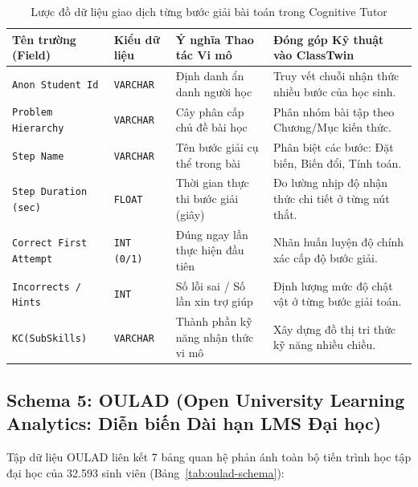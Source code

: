 \begin{table}[htbp]
  \centering\small
  \caption{Lược đồ dữ liệu giao dịch từng bước giải bài toán trong Cognitive Tutor}\label{tab:cognitive-tutor-schema}
  \begin{tabularx}{\textwidth}{p{3.8cm} p{2.2cm} p{4.0cm} X}
    \toprule
    \textbf{Tên trường (Field)} & \textbf{Kiểu dữ liệu} & \textbf{Ý nghĩa Thao tác Vi mô} & \textbf{Đóng góp Kỹ thuật vào ClassTwin} \\
    \midrule
    \texttt{Anon Student Id} & \texttt{VARCHAR} & Định danh ẩn danh người học & Truy vết chuỗi nhận thức nhiều bước của học sinh. \\
    \addlinespace
    \texttt{Problem Hierarchy} & \texttt{VARCHAR} & Cây phân cấp chủ đề bài học & Phân nhóm bài tập theo Chương/Mục kiến thức. \\
    \addlinespace
    \texttt{Step Name} & \texttt{VARCHAR} & Tên bước giải cụ thể trong bài & Phân biệt các bước: Đặt biến, Biến đổi, Tính toán. \\
    \addlinespace
    \texttt{Step Duration (sec)} & \texttt{FLOAT} & Thời gian thực thi bước giải (giây) & Đo lường nhịp độ nhận thức chi tiết ở từng nút thắt. \\
    \addlinespace
    \texttt{Correct First Attempt} & \texttt{INT (0/1)} & Đúng ngay lần thực hiện đầu tiên & Nhãn huấn luyện độ chính xác cấp độ bước giải. \\
    \addlinespace
    \texttt{Incorrects / Hints} & \texttt{INT} & Số lỗi sai / Số lần xin trợ giúp & Định lượng mức độ chật vật ở từng bước giải toán. \\
    \addlinespace
    \texttt{KC(SubSkills)} & \texttt{VARCHAR} & Thành phần kỹ năng nhận thức vi mô & Xây dựng đồ thị tri thức kỹ năng nhiều chiều. \\
    \bottomrule
  \end{tabularx}
\end{table}

\subsection{Schema 5: OULAD (Open University Learning Analytics: Diễn biến Dài hạn LMS Đại học)}\label{subsec:schema-oulad}
Tập dữ liệu OULAD liên kết 7 bảng quan hệ phản ánh toàn bộ tiến trình học tập đại học của 32.593 sinh viên (Bảng~\ref{tab:oulad-schema}):

